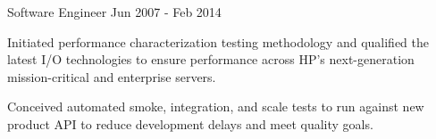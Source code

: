 \begin{cventries}
  \cventry
    {Software Engineer}
    {}
    {}
    {Jun 2007 - Feb 2014}
    {}
    {
      \begin{cvitems}
        \item {
          Initiated performance characterization testing methodology and
          qualified the latest I/O technologies to ensure performance across
          HP’s next-generation mission-critical and enterprise servers.
        }
        \item {
          Conceived automated smoke, integration, and scale tests to run
          against new product API to reduce development delays and meet
          quality goals.
        }
      \end{cvitems}
    }

\end{cventries}